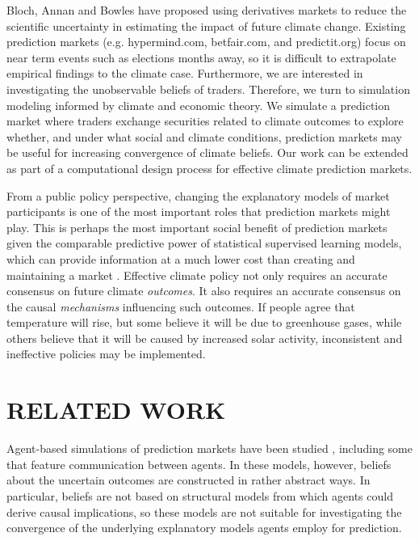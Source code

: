 \documentclass{wscpaperproc}\usepackage[]{graphicx}\usepackage[]{color}
\begin{document}
Bloch, Annan and Bowles  have proposed using derivatives markets to reduce the scientific uncertainty in estimating the impact of future climate change. Existing prediction markets (e.g. hypermind.com, betfair.com, and predictit.org) focus on near term events such as elections months away, so it is difficult to extrapolate empirical findings to the climate case. Furthermore, we are interested in investigating the unobservable beliefs of traders. Therefore, we turn to simulation modeling informed by climate and economic theory. We simulate a prediction market where traders exchange securities related to climate outcomes to explore whether, and under what social and climate conditions, prediction markets may be useful for increasing convergence of climate beliefs. Our work can be extended as part of a computational design process for effective climate prediction markets.

From a public policy perspective, changing the explanatory models of market participants is one of the most important roles that prediction markets might play. This is perhaps the most important social benefit of prediction markets given the comparable predictive power of statistical supervised learning models, which can provide information at a much lower cost than creating and maintaining a market . Effective climate policy not only requires an accurate consensus on future climate \emph{outcomes\/}. It also requires an accurate consensus on the causal \emph{mechanisms\/} influencing such outcomes. If people agree that temperature will rise, but some believe it will be due to greenhouse gases, while others believe that it will be caused by increased solar activity, inconsistent and ineffective policies may be implemented.

\section{RELATED WORK}

Agent-based simulations of prediction markets have been studied , including some that feature communication between agents. In these models, however, beliefs about the uncertain outcomes are constructed in rather abstract ways. In particular, beliefs are not based on structural models from which agents could derive causal implications, so these models are not suitable for investigating the convergence of the underlying explanatory models agents employ for prediction.
\end{document}
